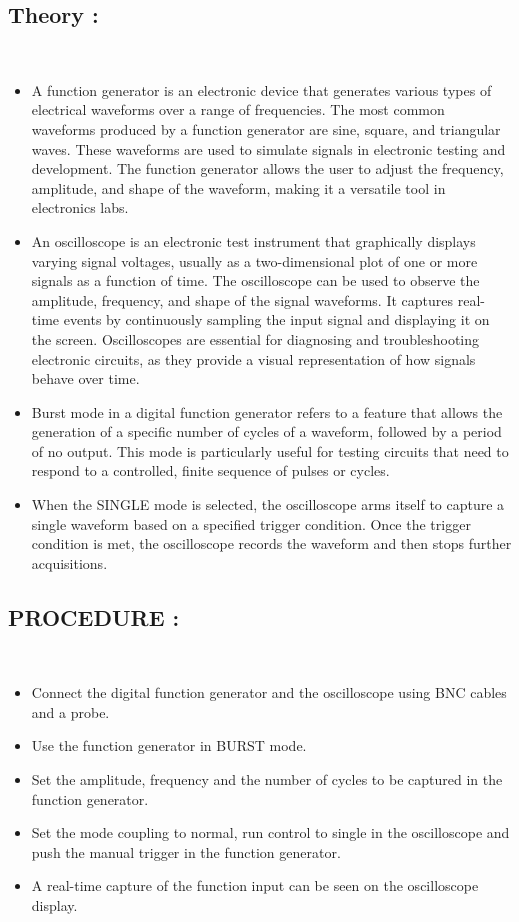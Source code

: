 \documentclass[report]{IEEEtran}
\begin{document}
\subsection{Theory : } \\
\begin{itemize}
\item A \color{blue} function generator \color{black} is an electronic device that generates various types of electrical waveforms over a range of frequencies. The most common waveforms produced by a function generator are sine, square, and triangular waves. These waveforms are used to simulate signals in electronic testing and development. The function generator allows the user to adjust the frequency, amplitude, and shape of the waveform, making it a versatile tool in electronics labs.
\item An \color{blue} oscilloscope \color{black} is an electronic test instrument that graphically displays varying signal voltages, usually as a two-dimensional plot of one or more signals as a function of time. The oscilloscope can be used to observe the amplitude, frequency, and shape of the signal waveforms. It captures real-time events by continuously sampling the input signal and displaying it on the screen. Oscilloscopes are essential for diagnosing and troubleshooting electronic circuits, as they provide a visual representation of how signals behave over time.
\item \color{blue} Burst mode \color{black} in a digital function generator refers to a feature that allows the generation of a specific number of cycles of a waveform, followed by a period of no output. This mode is particularly useful for testing circuits that need to respond to a controlled, finite sequence of pulses or cycles.
\item When the \color{blue} SINGLE mode \color{black} is selected, the oscilloscope arms itself to capture a single waveform based on a specified trigger condition. Once the trigger condition is met, the oscilloscope records the waveform and then stops further acquisitions.

\end{itemize}

\subsection{PROCEDURE : } \\
\begin{itemize}
	\item Connect the digital function generator and the oscilloscope using BNC cables and a probe.
	\item Use the function generator in \color{blue} BURST \color{black} mode.
	\item Set the amplitude, frequency and the number of cycles to be captured in the function generator.
	\item Set the mode coupling to normal, run control to single in the oscilloscope and push the manual trigger in the function generator.
	\item A real-time capture of the function input can be seen on the oscilloscope display.
\end{itemize}
\end{document}
